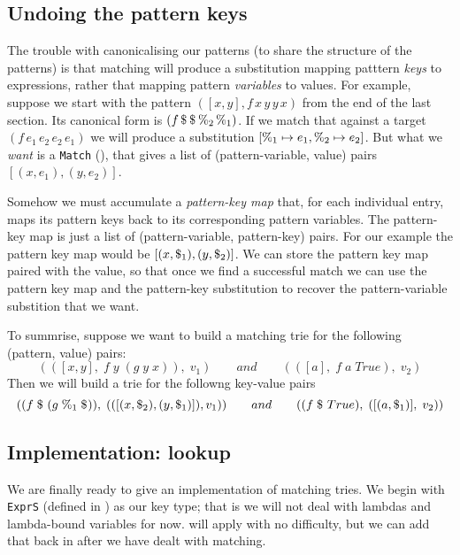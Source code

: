 \documentclass[acmsmall]{acmart}
\theoremstyle{theorem}
\theoremstyle{definition}
\theoremstyle{remark}
\begin{document}
\subsection{Undoing the pattern keys} \label{sec:patkeymap}

The trouble with canonicalising our patterns (to share the structure of the patterns)
is that matching will produce a substitution mapping patttern \emph{keys} to
expressions, rather that mapping pattern \emph{variables} to values.  For example,
suppose we start with the pattern $([x,y], f \,x\, y\, y\, x)$ from the
end of the last section. Its canonical form is $(f \,\$_{}\, \$_{}\, \%_{2}\, \%_{1})$.
If we match that against a target $(f\,e_1\,e_2\,e_2\,e_1)$ we will produce a substitution $[\%_{1} \mapsto e_1, \%_{2} \mapsto e_2]$.
But  what we \emph{want} is a \lstinline{Match} (),
that gives a list of (pattern-variable, value) pairs $[(x, e_1), (y,e_2)]$.

Somehow we must accumulate a \emph{pattern-key map} that, for each
individual entry, maps its pattern keys back to its corresponding
pattern variables.  The pattern-key map is just a list of (pattern-variable, pattern-key) pairs.
For our example the pattern key map would be
$[(x, \$_{1}), (y,\$_{2})]$.  We can store the pattern key
map paired with the value, so that once we find a successful match we can use the pattern
key map and the pattern-key substitution to recover the pattern-variable substition that we want.

To summrise, suppose we want to build a matching trie for the following (pattern, value) pairs:
$$
(([x,y],\; f\;y\;(g\;y\;x)),\; v_1) \qquad and \qquad (([a],\; f\;a\;True),\;v_2)
$$
Then we will build a trie for the followng key-value pairs
$$
( (f \;\$_{}\;(g\;\%_{1}\;\$_{})),\; (([(x,\$_{2}),(y,\$_{1})]), v_1) )
  \qquad and \qquad
( (f \;\$_{}\;True),\; ([(a,\$_{1})],\;v_2) )
$$


\subsection{Implementation: lookup} \label{sec:matching-lookup}

We are finally ready to give an implementation of matching tries.
We begin with \lstinline{ExprS} (defined in ) as our key type;
that is we will not deal with lambdas and lambda-bound variables for now.
 will apply with no difficulty, but we can add that back
in after we have dealt with matching.
\end{document}
